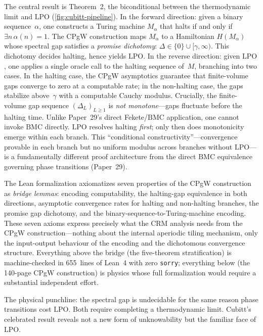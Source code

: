 \documentclass[11pt,a4paper]{report}
\theoremstyle{plain}
\theoremstyle{definition}
\theoremstyle{remark}
\newcommand{\LPO}{\mathrm{LPO}}
\newcommand{\BMC}{\mathrm{BMC}}
\begin{document}
The central result is Theorem~2, the biconditional between the thermodynamic limit and $\LPO$ (\cref{fig:cubitt-pipeline}). In the forward direction: given a binary sequence~$\alpha$, one constructs a Turing machine $M_\alpha$ that halts if and only if $\exists n\, \alpha(n)=1$. The CPgW construction maps $M_\alpha$ to a Hamiltonian $H(M_\alpha)$ whose spectral gap satisfies a \emph{promise dichotomy}: $\Delta \in \{0\} \cup [\gamma, \infty)$. This dichotomy decides halting, hence yields $\LPO$. In the reverse direction: given $\LPO$, one applies a single oracle call to the halting sequence of~$M$, branching into two cases. In the halting case, the CPgW asymptotics guarantee that finite-volume gaps converge to zero at a computable rate; in the non-halting case, the gaps stabilize above~$\gamma$ with a computable Cauchy modulus. Crucially, the finite-volume gap sequence $(\Delta_L)_{L \geq 1}$ is \emph{not monotone}---gaps fluctuate before the halting time. Unlike Paper~29's direct Fekete/$\BMC$ application, one cannot invoke $\BMC$ directly. $\LPO$ resolves halting \emph{first}; only then does monotonicity emerge within each branch. This ``conditional constructivity''---convergence provable in each branch but no uniform modulus across branches without $\LPO$---is a fundamentally different proof architecture from the direct $\BMC$ equivalence governing phase transitions (Paper~29).

The Lean formalization axiomatizes seven properties of the CPgW construction as \emph{bridge lemmas}: encoding computability, the halting-gap equivalence in both directions, asymptotic convergence rates for halting and non-halting branches, the promise gap dichotomy, and the binary-sequence-to-Turing-machine encoding. These seven axioms express precisely what the CRM analysis needs from the CPgW construction---nothing about the internal aperiodic tiling mechanism, only the input-output behaviour of the encoding and the dichotomous convergence structure. Everything above the bridge (the five-theorem stratification) is machine-checked in 655~lines of Lean~4 with zero \texttt{sorry}; everything below (the 140-page CPgW construction) is physics whose full formalization would require a substantial independent effort.

The physical punchline: the spectral gap is undecidable for the same reason phase transitions cost $\LPO$. Both require completing a thermodynamic limit. Cubitt's celebrated result reveals not a new form of unknowability but the familiar face of $\LPO$.
\end{document}
